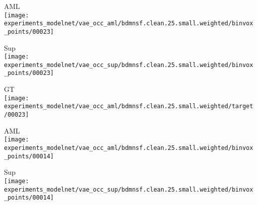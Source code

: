 \begin{minipage}[t]{0.04\textwidth}
    \vspace{0px}
    \centering
\end{minipage}
\begin{minipage}[t]{0.95\textwidth}
    \begin{minipage}[t]{0.155\textwidth}
        \vspace{0px}
        \centering
        \small AML\\[2mm]
        \texttt{[image: experiments\_modelnet/vae\_occ\_aml/bdmnsf.clean.25.small.weighted/binvox\_points/00023]}
    \end{minipage}
    \begin{minipage}[t]{0.155\textwidth}
        \vspace{0px}
        \centering
        \small Sup\\[2mm]
        \texttt{[image: experiments\_modelnet/vae\_occ\_sup/bdmnsf.clean.25.small.weighted/binvox\_points/00023]}
    \end{minipage}
    \begin{minipage}[t]{0.155\textwidth}
        \vspace{0px}
        \centering
        \small GT\\[2mm]
        \texttt{[image: experiments\_modelnet/vae\_occ\_aml/bdmnsf.clean.25.small.weighted/target/00023]}
    \end{minipage}
    \begin{minipage}[t]{0.155\textwidth}
        \vspace{0px}
        \centering
        \small AML\\[2mm]
        \texttt{[image: experiments\_modelnet/vae\_occ\_aml/bdmnsf.clean.25.small.weighted/binvox\_points/00014]}
    \end{minipage}
    \begin{minipage}[t]{0.155\textwidth}
        \vspace{0px}
        \centering
        \small Sup\\[2mm]
        \texttt{[image: experiments\_modelnet/vae\_occ\_sup/bdmnsf.clean.25.small.weighted/binvox\_points/00014]}
    \end{minipage}
    \begin{minipage}[t]{0.155\textwidth}

\end{minipage}
\end{minipage}
